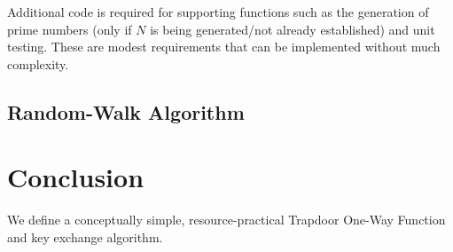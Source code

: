 \documentclass[preprint]{iacrtrans}
\begin{document}
Additional code is required for supporting functions such as the generation of prime numbers (only if $N$ is being generated/not already established) and unit testing. These are modest requirements that can be implemented without much complexity. \\

\subsection{Random-Walk Algorithm}


\section{Conclusion}
We define a conceptually simple, resource-practical Trapdoor One-Way Function and key exchange algorithm. 
\end{document}

